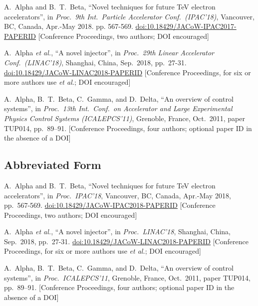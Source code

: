\newcommand{\CCom}[2]{\newline\textcolor{#1}{[#2]}}
\begin{thebibliography}{9} %
	
	A.~Alpha and B.~T.~Beta, “Novel techniques for future TeV electron accelerators”,
	in \textit{Proc.\ 9th Int.\ Particle Accelerator Conf.\ (IPAC’18)},
	Vancouver, BC, Canada, Apr.-May 2018.
	pp. 567-569. \url{doi:10.18429/JACoW-IPAC2017-PAPERID}
	\CCom{jgreen}{Conference Proceedings, two authors; DOI encouraged}

	A.~Alpha \emph{et al.},
	“A novel injector”, in \emph{Proc.\ 29th Linear Accelerator Conf.\ (LINAC’18)},
	Shanghai, China, Sep.\ 2018, pp.\ 27-31. %
	\url{doi:10.18429/JACoW-LINAC2018-PAPERID}
	\CCom{jgreen}{Conference Proceedings, for six or more authors use \emph{et al.};	
		 DOI encouraged}
	
	A.~Alpha, B.~T.~Beta, C.~Gamma, and D.~Delta,
	“An overview of control systems”,
	in \emph{Proc.\ 13th Int.\ Conf.\ on Accelerator and Large Experimental Physics Control Systems (ICALEPCS’11)}, Grenoble, France, Oct.\ 2011,
	paper TUP014, pp.\ 89--91.
	\CCom{jgreen}{Conference Proceedings, four authors; optional paper ID
	in the absence of a DOI}
\end{thebibliography}

\vspace*{-.5\baselineskip}
\subsection{Abbreviated Form}

\begin{thebibliography}{9} %
	A.~Alpha and B.~T.~Beta, “Novel techniques for future TeV electron accelerators”,
	in \textit{Proc.\ IPAC’18}, 	Vancouver, BC, Canada, Apr.-May 2018,
	pp.\ 567-569. %
	\url{doi:10.18429/JACoW-IPAC2018-PAPERID}
	\CCom{jgreen}{Conference Proceedings, two authors; DOI encouraged}
	
	A.~Alpha \emph{et al.},
	“A novel injector”, in \emph{Proc.\ LINAC’18},
	Shanghai, China, Sep.\ 2018, pp.\ 27-31. %
	\url{doi:10.18429/JACoW-LINAC2018-PAPERID}
	\CCom{jgreen}{Conference Proceedings, for six or more authors use \emph{et al.}; DOI encouraged}
	
	A.~Alpha, B.~T.~Beta, C.~Gamma, and D.~Delta,
	“An overview of control systems”,
	in \emph{Proc.\ ICALEPCS’11}, Grenoble, France, Oct.\ 2011,
	paper TUP014, pp.\ 89--91.
	\CCom{jgreen}{Conference Proceedings, four authors; optional paper ID
				  in the absence of a DOI}
\end{thebibliography}

